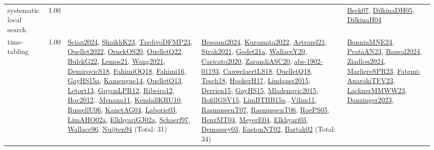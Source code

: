 {\begin{longtable}{p{3cm}r>{\raggedright\arraybackslash}p{6cm}>{\raggedright\arraybackslash}p{6cm}>{\raggedright\arraybackslash}p{8cm}}
\index{systematic local search}\index{Algorithms!systematic local search}systematic local search &  1.00 &  &  & \hyperref[detail:Beck07]{Beck07}, \hyperref[detail:DilkinaDH05]{DilkinaDH05}, \hyperref[detail:DilkinaH04]{DilkinaH04}\\
\index{time-tabling}\index{Algorithms!time-tabling}time-tabling &  1.00 & \hyperref[detail:Sciau2024]{Sciau2024}, \hyperref[detail:ShaikhK23]{ShaikhK23}, \hyperref[detail:TardivoDFMP23]{TardivoDFMP23}, \hyperref[detail:Ouellet2022]{Ouellet2022}, \hyperref[detail:OrnekOS20]{OrnekOS20}, \hyperref[detail:OuelletQ22]{OuelletQ22}, \hyperref[detail:BulckG22]{BulckG22}, \hyperref[detail:Lemos21]{Lemos21}, \hyperref[detail:Wang2021]{Wang2021}, \hyperref[detail:DemirovicS18]{DemirovicS18}, \hyperref[detail:FahimiOQ18]{FahimiOQ18}, \hyperref[detail:Fahimi16]{Fahimi16}, \hyperref[detail:GayHS15a]{GayHS15a}, \hyperref[detail:Kameugne14]{Kameugne14}, \hyperref[detail:OuelletQ13]{OuelletQ13}, \hyperref[detail:Letort13]{Letort13}, \hyperref[detail:GuyonLPR12]{GuyonLPR12}, \hyperref[detail:Ribeiro12]{Ribeiro12}, \hyperref[detail:Hoc2012]{Hoc2012}...\hyperref[detail:Menana11]{Menana11}, \hyperref[detail:KendallKRU10]{KendallKRU10}, \hyperref[detail:RussellU06]{RussellU06}, \hyperref[detail:KanetAG04]{KanetAG04}, \hyperref[detail:Laborie03]{Laborie03}, \hyperref[detail:LimAHO02a]{LimAHO02a}, \hyperref[detail:ElkhyariGJ02a]{ElkhyariGJ02a}, \hyperref[detail:Schaerf97]{Schaerf97}, \hyperref[detail:Wallace96]{Wallace96}, \hyperref[detail:Nuijten94]{Nuijten94} (Total: 31) & \hyperref[detail:Hessami2024]{Hessami2024}, \hyperref[detail:Kuramata2022]{Kuramata2022}, \hyperref[detail:Astrand21]{Astrand21}, \hyperref[detail:Strak2021]{Strak2021}, \hyperref[detail:Godet21a]{Godet21a}, \hyperref[detail:WallaceY20]{WallaceY20}, \hyperref[detail:Caricato2020]{Caricato2020}, \hyperref[detail:ZarandiASC20]{ZarandiASC20}, \hyperref[detail:abs-1902-01193]{abs-1902-01193}, \hyperref[detail:CauwelaertLS18]{CauwelaertLS18}, \hyperref[detail:OuelletQ18]{OuelletQ18}, \hyperref[detail:Tesch18]{Tesch18}, \hyperref[detail:HookerH17]{HookerH17}, \hyperref[detail:Lindauer2015]{Lindauer2015}, \hyperref[detail:Derrien15]{Derrien15}, \hyperref[detail:GayHS15]{GayHS15}, \hyperref[detail:Mladenovic2015]{Mladenovic2015}, \hyperref[detail:BofillGSV15]{BofillGSV15}, \hyperref[detail:LimBTBB15a]{LimBTBB15a}...\hyperref[detail:Vilim11]{Vilim11}, \hyperref[detail:RasmussenT07]{RasmussenT07}, \hyperref[detail:RasmussenT06]{RasmussenT06}, \hyperref[detail:RoePS05]{RoePS05}, \hyperref[detail:HenzMT04]{HenzMT04}, \hyperref[detail:MeyerE04]{MeyerE04}, \hyperref[detail:Elkhyari03]{Elkhyari03}, \hyperref[detail:Demassey03]{Demassey03}, \hyperref[detail:EastonNT02]{EastonNT02}, \hyperref[detail:Bartak02]{Bartak02} (Total: 34) & \hyperref[detail:BonninMNE24]{BonninMNE24}, \hyperref[detail:PrataAN23]{PrataAN23}, \hyperref[detail:Bansal2024]{Bansal2024}, \hyperref[detail:Ziadlou2024]{Ziadlou2024}, \hyperref[detail:MarliereSPR23]{MarliereSPR23}, \hyperref[detail:Fatemi-AnarakiTFV23]{Fatemi-AnarakiTFV23}, \hyperref[detail:LacknerMMWW23]{LacknerMMWW23}, \hyperref[detail:Danzinger2023]{Danzinger2023}, 
\end{longtable}}
